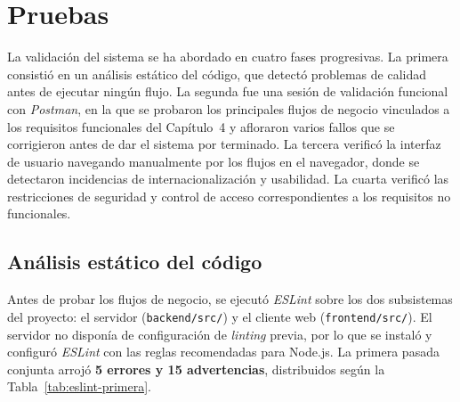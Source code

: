 \documentclass[11pt,oneside,spanish,listoffigures,listoftables]{tfgetsinf}
\begin{document}
\chapter{Pruebas}

La validación del sistema se ha abordado en cuatro fases progresivas. La primera consistió en un análisis estático del código, que detectó problemas de calidad antes de ejecutar ningún flujo. La segunda fue una sesión de validación funcional con \textit{Postman}, en la que se probaron los principales flujos de negocio vinculados a los requisitos funcionales del Capítulo~4 y afloraron varios fallos que se corrigieron antes de dar el sistema por terminado. La tercera verificó la interfaz de usuario navegando manualmente por los flujos en el navegador, donde se detectaron incidencias de internacionalización y usabilidad. La cuarta verificó las restricciones de seguridad y control de acceso correspondientes a los requisitos no funcionales.

\section{Análisis estático del código}

Antes de probar los flujos de negocio, se ejecutó \textit{ESLint} sobre los dos subsistemas del proyecto: el servidor (\texttt{backend/src/}) y el cliente web (\texttt{frontend/src/}). El servidor no disponía de configuración de \textit{linting} previa, por lo que se instaló y configuró \textit{ESLint} con las reglas recomendadas para Node.js. La primera pasada conjunta arrojó \textbf{5 errores y 15 advertencias}, distribuidos según la Tabla~\ref{tab:eslint-primera}.
\end{document}
